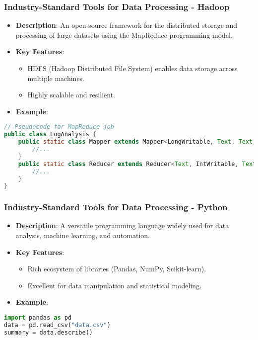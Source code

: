 \documentclass[aspectratio=169]{beamer}
\begin{document}
\begin{frame}[fragile]
    \frametitle{Industry-Standard Tools for Data Processing - Hadoop}
    \begin{itemize}
        \item \textbf{Description}: An open-source framework for the distributed storage and processing of large datasets using the MapReduce programming model.
        \item \textbf{Key Features}:
        \begin{itemize}
            \item HDFS (Hadoop Distributed File System) enables data storage across multiple machines.
            \item Highly scalable and resilient.
        \end{itemize}
        \item \textbf{Example}:
        \end{itemize}
        
        \begin{lstlisting}[language=Java]
// Pseudocode for MapReduce job
public class LogAnalysis {
    public static class Mapper extends Mapper<LongWritable, Text, Text, IntWritable> {
        //...
    }
    public static class Reducer extends Reducer<Text, IntWritable, Text, IntWritable> {
        //...
    }
}
        \end{lstlisting}
\end{frame}

\begin{frame}[fragile]
    \frametitle{Industry-Standard Tools for Data Processing - Python}
    \begin{itemize}
        \item \textbf{Description}: A versatile programming language widely used for data analysis, machine learning, and automation.
        \item \textbf{Key Features}:
        \begin{itemize}
            \item Rich ecosystem of libraries (Pandas, NumPy, Scikit-learn).
            \item Excellent for data manipulation and statistical modeling.
        \end{itemize}
        \item \textbf{Example}:
        \end{itemize}
        
        \begin{lstlisting}[language=Python]
import pandas as pd
data = pd.read_csv("data.csv")
summary = data.describe()
        \end{lstlisting}
\end{frame}
\end{document}
